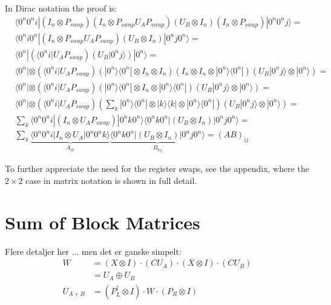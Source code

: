 \documentclass[11pt]{article}
\begin{document}
In Dirac notation the proof is:
\begin{equation*}
\begin{aligned}
&\langle 0^n0^ni | (I_n \otimes P_{swap}) (I_n \otimes P_{swap} U_A P_{swap}) (U_B \otimes I_n) (I_n \otimes P_{swap}) | 0^n0^nj \rangle = \\
&\langle 0^ni0^n | (I_n \otimes P_{swap} U_A P_{swap}) (U_B \otimes I_n) | 0^nj0^n \rangle = \\
&\langle 0^n | \left( \langle 0^ni | U_A P_{swap} \right) \left( U_B | 0^nj \rangle \right) | 0^n \rangle = \\
&\langle 0^n | \otimes ( \langle 0^ni | U_A P_{swap} ) (|0^n\rangle \langle 0^n| \otimes I_n \otimes I_n) (I_n \otimes I_n \otimes |0^n\rangle \langle 0^n|) ( U_B | 0^nj \rangle \otimes |0^n\rangle ) = \\
&\langle 0^n | \otimes ( \langle 0^ni | U_A P_{swap} ) (|0^n\rangle \langle 0^n| \otimes I_n \otimes |0^n\rangle \langle 0^n|) ( U_B | 0^nj \rangle \otimes |0^n\rangle ) = \\
&\langle 0^n | \otimes ( \langle 0^ni | U_A P_{swap} ) \left( \sum_k |0^n\rangle \langle 0^n| \otimes |k\rangle \langle k| \otimes |0^n\rangle \langle 0^n| \right) ( U_B | 0^nj \rangle \otimes |0^n\rangle ) = \\
&\sum_k \langle 0^n0^ni | (I_n \otimes U_A P_{swap}) | 0^nk0^n \rangle \langle 0^nk0^n | (U_B \otimes I_n) | 0^nj0^n \rangle = \\
&\sum_k \underbrace{\langle 0^n0^ni | I_n \otimes U_A | 0^n0^nk \rangle}_{A_{ik}} \underbrace{\langle 0^nk0^n | (U_B \otimes I_n) | 0^nj0^n \rangle}_{B_{kj}} = (AB)_{ij}
\end{aligned}
\end{equation*}

To further appreciate the need for the register swaps, see the appendix, where the $2\times2$ case in matrix notation is shown in full detail.

%
%

\section*{Sum of Block Matrices}

Flere detaljer her ... men det er ganske simpelt:
\begin{align*}
        W &= (X \otimes I) \cdot (C U_A) \cdot (X \otimes I) \cdot (C U_B) \\
             &= U_A  \oplus U_B \\
        U_{A+B} &= (P_L^{\dagger} \otimes I) \cdot W \cdot (P_R \otimes I)
\end{align*}
\end{document}
